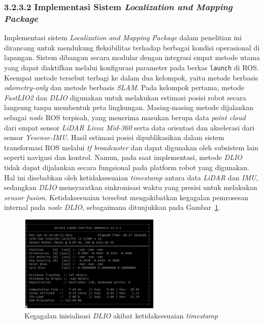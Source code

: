 \subsubsection{3.2.3.2 Implementasi Sistem \emph{Localization and Mapping Package}}

Implementasi sistem \emph{Localization and Mapping Package} dalam penelitian ini dirancang untuk mendukung fleksibilitas terhadap berbagai kondisi operasional di lapangan. Sistem dibangun secara modular dengan integrasi empat metode utama yang dapat diaktifkan melalui konfigurasi parameter pada berkas \texttt{launch} di ROS. Keempat metode tersebut terbagi ke dalam dua kelompok, yaitu metode berbasis \emph{odometry-only} dan metode berbasis \emph{SLAM}. Pada kelompok pertama, metode \emph{FastLIO2} dan \emph{DLIO} digunakan untuk melakukan estimasi posisi robot secara langsung tanpa membentuk peta lingkungan. Masing-masing metode dijalankan sebagai \emph{node} ROS terpisah, yang menerima masukan berupa data \emph{point cloud} dari empat sensor \emph{LiDAR Livox Mid-360} serta data orientasi dan akselerasi dari sensor \emph{Yesense-IMU}. Hasil estimasi posisi dipublikasikan dalam sistem transformasi ROS melalui \emph{tf broadcaster} dan dapat digunakan oleh subsistem lain seperti navigasi dan kontrol. Namun, pada saat implementasi, metode \emph{DLIO} tidak dapat dijalankan secara fungsional pada platform robot yang digunakan. Hal ini disebabkan oleh ketidaksesuaian \emph{timestamp} antara data \emph{LiDAR} dan \emph{IMU}, sedangkan \emph{DLIO} mensyaratkan sinkronisasi waktu yang presisi untuk melakukan \emph{sensor fusion}. Ketidaksesuaian tersebut mengakibatkan kegagalan pemrosesan internal pada \emph{node} \emph{DLIO}, sebagaimana ditunjukkan pada Gambar~\ref{fig:dlio-error}.

\begin{figure}[H]
  \centering
  \includegraphics[width=0.6\textwidth]{gambar/bab3/dlio-error.png}
  \caption{Kegagalan inisialisasi \emph{DLIO} akibat ketidaksesuaian \emph{timestamp}} 
  \label{fig:dlio-error}
\end{figure}

